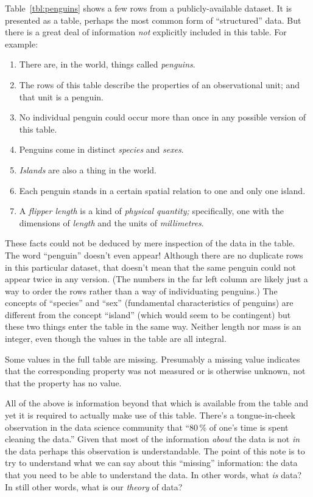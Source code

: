 \documentclass[10pt, a4paper, twocolumn]{article}
\begin{document}
Table~\ref{tbl:penguins} shows a few rows from a publicly-available dataset. It
is presented as a table, perhaps the most common form of ``structured'' data. But
there is a great deal of information \emph{not} explicitly included in this
table. For example:
\begin{enumerate}
\item{There are, in the world, things called \emph{penguins}.}
\item{The rows of this table describe the properties of an observational unit;
  and that unit is a penguin.}
\item{No individual penguin could occur more than once in any possible version
  of this table.}
\item{Penguins come in distinct \emph{species} and \emph{sexes}.}
\item{\emph{Islands} are also a thing in the world.}
\item{Each penguin stands in a certain spatial relation to one and only one
  island.}
\item{A \emph{flipper length} is a kind of \emph{physical quantity;} specifically, one
  with the dimensions of \emph{length} and the units of \emph{millimetres}.}
 \end{enumerate}
These facts could not be deduced by mere inspection of the data in the
table. The word ``penguin'' doesn't even appear! Although there are no duplicate
rows in this particular dataset, that doesn't mean that the same penguin could
not appear twice in any version. (The numbers in the far left column are likely
just a way to order the rows rather than a way of individuating penguins.) The
concepts of ``species'' and ``sex'' (fundamental characteristics of penguins)
are different from the concept ``island'' (which would seem to be contingent)
but these two things enter the table in the same way. Neither length nor mass is
an integer, even though the values in the table are all integral.

Some values in the full table are missing. Presumably a missing value indicates
that the corresponding property was not measured or is otherwise unknown, not
that the property has no value. 

All of the above is information beyond that which is available from the table
and yet it is required to actually make use of this table. There's a
tongue-in-cheek observation in the data science community that ``80\,\% of one's
time is spent cleaning the data.'' Given that most of the information
\emph{about} the data is not \emph{in} the data perhaps this observation is
understandable. The point of this note is to try to understand what we can say
about this ``missing'' information: the data that you need to be able to
understand the data. In other words, what \emph{is} data? In still other words,
what is our \emph{theory} of data?
\end{document}
